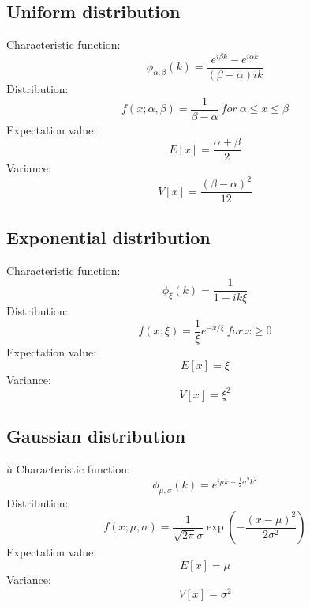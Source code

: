 \documentclass[12pt]{book}
\begin{document}
\subsection{Uniform distribution}
Characteristic function:
\begin{equation}
	\phi_{\alpha,\beta}(k)=\frac{e^{i\beta k}-e^{i\alpha k}}{\left(\beta-\alpha\right)ik}
\end{equation}
Distribution:
\begin{equation}
	f(x;\alpha,\beta) = \frac{1}{\beta-\alpha} \ for \ \alpha \leq x \leq \beta 
\end{equation}
Expectation value:
\begin{equation}
	E[x] = \frac{\alpha + \beta}{2}
\end{equation}
Variance:
\begin{equation}
	V[x] = \frac{(\beta - \alpha)^2}{12}
\end{equation}
\subsection{Exponential distribution}
Characteristic function:
\begin{equation}
	\phi_\xi(k)=\frac{1}{1-ik\xi}
\end{equation}
Distribution:
\begin{equation}
	f(x;\xi) = \frac{1}{\xi}e^{-x/\xi} \ for \ x \geq 0
\end{equation}
Expectation value:
\begin{equation}
	E[x] = \xi
\end{equation}
Variance:
\begin{equation}
	V[x] = \xi^2
\end{equation}
\subsection{Gaussian distribution}ù
Characteristic function:
\begin{equation}
	\phi_{\mu,\sigma}(k)=e^{i\mu k-\frac{1}{2}\sigma^2k^2}
\end{equation}
Distribution:
\begin{equation}
	f(x;\mu,\sigma) = \frac{1}{\sqrt{2\pi}\sigma}\exp\left(-\frac{(x-\mu)^2}{2\sigma^2}\right)
\end{equation}
Expectation value:
\begin{equation}
	E[x] = \mu
\end{equation}
Variance:
\begin{equation}
	V[x] = \sigma^2
\end{equation}
\end{document}
